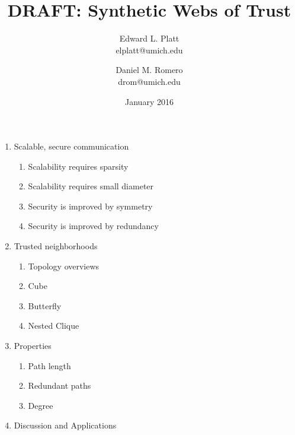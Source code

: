 \documentclass[twocolumn]{article}
\title{DRAFT: Synthetic Webs of Trust}
\author{
Edward L. Platt \\
elplatt@umich.edu
\and
Daniel M. Romero \\
drom@umich.edu
}
\date{January 2016}
\begin{document}
\maketitle

\begin{enumerate}
\item{Scalable, secure communication}
    \begin{enumerate}
    \item{Scalability requires sparsity}
    \item{Scalability requires small diameter}
    \item{Security is improved by symmetry} 
    \item{Security is improved by redundancy}
    \end{enumerate}
\item{Trusted neighborhoods}
    \begin{enumerate}
    \item{Topology overviews}
    \item{Cube}
    \item{Butterfly}
    \item{Nested Clique}
    \end{enumerate}
\item{Properties}
    \begin{enumerate}
    \item{Path length}
    \item{Redundant paths}
    \item{Degree}
    \end{enumerate}
\item{Discussion and Applications}
\end{enumerate}



\end{document}
